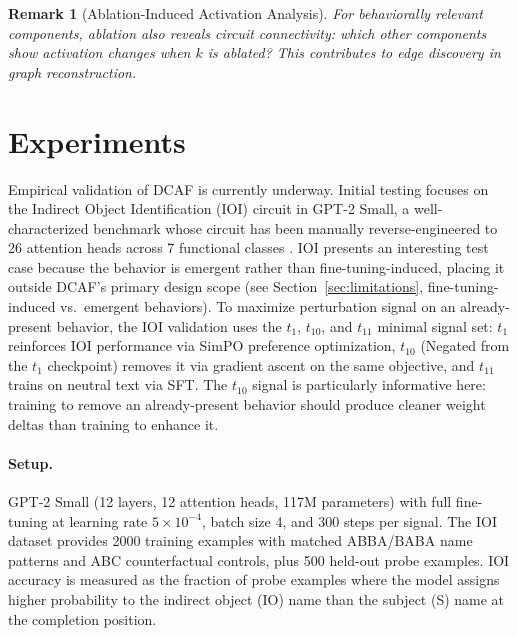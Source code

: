 \documentclass[11pt]{article}
\newtheorem{remark}{Remark}[section]
\begin{document}
\begin{remark}[Ablation-Induced Activation Analysis]
\label{rem:ablation-induced-activation-analysis}
For behaviorally relevant components, ablation also reveals circuit connectivity: which other components show activation changes when $k$ is ablated? This contributes to edge discovery in graph reconstruction.
\end{remark}

\section{Experiments}
\label{sec:experiments}

Empirical validation of DCAF is currently underway. Initial testing focuses on the Indirect Object Identification (IOI) circuit in GPT-2 Small, a well-characterized benchmark whose circuit has been manually reverse-engineered to 26 attention heads across 7 functional classes \citep{wang2023ioi}. IOI presents an interesting test case because the behavior is emergent rather than fine-tuning-induced, placing it outside DCAF's primary design scope (see Section~\ref{sec:limitations}, fine-tuning-induced vs.\ emergent behaviors). To maximize perturbation signal on an already-present behavior, the IOI validation uses the $t_1$, $t_{10}$, and $t_{11}$ minimal signal set: $t_1$ reinforces IOI performance via SimPO preference optimization, $t_{10}$ (Negated from the $t_1$ checkpoint) removes it via gradient ascent on the same objective, and $t_{11}$ trains on neutral text via SFT. The $t_{10}$ signal is particularly informative here: training to remove an already-present behavior should produce cleaner weight deltas than training to enhance it.

\paragraph{Setup.} GPT-2 Small (12 layers, 12 attention heads, 117M parameters) with full fine-tuning at learning rate $5 \times 10^{-4}$, batch size 4, and 300 steps per signal. The IOI dataset provides 2000 training examples with matched ABBA/BABA name patterns and ABC counterfactual controls, plus 500 held-out probe examples. IOI accuracy is measured as the fraction of probe examples where the model assigns higher probability to the indirect object (IO) name than the subject (S) name at the completion position.
\end{document}
